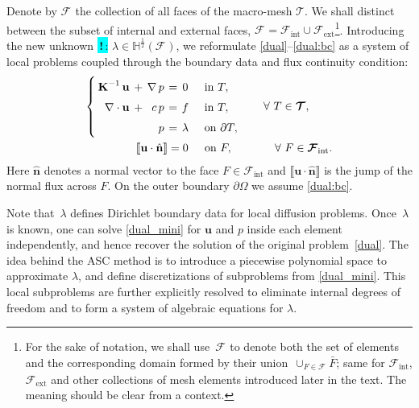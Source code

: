 \documentclass[12pt]{article}
\newcommand{\vect}[1]{\boldsymbol{\mathbf{#1}}}
\newcommand{\bcell}{T}
\newcommand{\bmesh}{{\vect{\mathcal T}}}
\newcommand{\bface}{F}
\newcommand{\bfaces}[1][]{{\vect{\mathcal F}_{\text{#1}}}}
\newcommand{\HHalfSpace}[1][\bface]{{\mathbb H^{\frac{1}{2}}\left({#1}\right)}}
\newcommand{\toDiscuss}[1]{\colorbox{Cyan}{\textbf{\,!\,}:} #1}
\begin{document}
Denote by $\bfaces$ the collection of all faces of the macro-mesh $\bmesh$. We shall distinct between the subset of internal and external faces,  $\bfaces = \bfaces[int] \cup \bfaces[ext]$\footnote{For the sake of  notation, we shall use~$\bfaces$ to denote both the set of elements and the corresponding domain formed by their union~$\cup_{F\in \bfaces} \bar{F}$; same for $\bfaces[int]$, $\bfaces[ext]$ and other collections of mesh elements introduced later in the text. The meaning should be clear from a context.}.
Introducing the new unknown \toDiscuss{$\lambda \in \HHalfSpace[\bfaces]$}, we reformulate \eqref{dual}--\eqref{dual:bc} as a system of local problems coupled through the boundary data
and flux continuity condition:
\begin{eqnarray}
	\arraycolsep=2pt\def\arraystretch{1.5}
	\left\{\begin{array}{rcrccl}
		\vect K^{-1}\,\vect u                    & + & \nabla\,p & = & 0       &\quad\text{in } \bcell, \\
		\nabla\cdot\vect u                       & + & c\,p      & = & f       &\quad\text{in } \bcell, \\
		                                         &   & p         & = & \lambda &\quad\text{on } \partial\bcell, %
	\end{array}\right. 
	& \qquad \forall~\bcell\in\bmesh, \label{dual_mini} \\
	\llbracket\vect u \cdot \hat{\vect n}\rrbracket = 0\quad\:\:\text{on } F,\:\:\:\:
	& \qquad\quad \forall~F\in\bfaces[int]. \label{flux_cond}
\end{eqnarray}
Here $\hat{\vect n}$ denotes a normal vector to the face $F\in\bfaces[int]$ and $\llbracket \vect u\cdot\hat{\vect n} \rrbracket$ is the jump of the normal flux across $F$. On the outer boundary $\partial\Omega$ we assume \eqref{dual:bc}.

Note that~$\lambda$ defines Dirichlet boundary data for local diffusion problems. Once~$\lambda$ is known, one can solve \eqref{dual_mini} for $\vect u$ and $p$ inside each element independently, and hence recover the solution of the original problem~\eqref{dual}. The idea behind the ASC method is to introduce a piecewise polynomial space to approximate $\lambda$, and  define discretizations of subproblems from \eqref{dual_mini}. This local subproblems are further explicitly resolved to eliminate internal degrees of freedom and to form a system of algebraic equations for $\lambda$.
\end{document}
